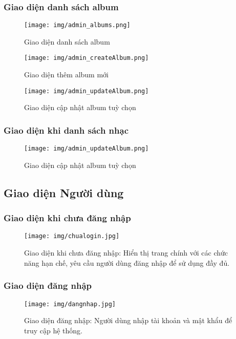 \documentclass[a4paper,12pt]{article}
\begin{document}
\subsubsection{Giao diện danh sách album}
\begin{figure}[H]
  \centering
  \texttt{[image: img/admin\_albums.png]}
  \caption{Giao diện danh sách album}
  \label{fig:admin-interface}
\end{figure}
\begin{figure}[H]
  \centering
  \texttt{[image: img/admin\_createAlbum.png]}
  \caption{Giao diện thêm album mới}
  \label{fig:admin-interface}
\end{figure}
\begin{figure}[H]
  \centering
  \texttt{[image: img/admin\_updateAlbum.png]}
  \caption{Giao diện cập nhật album tuỳ chọn}
  \label{fig:admin-interface}
\end{figure}
\subsubsection{Giao diện khi danh sách nhạc}
\begin{figure}[H]
  \centering
  \texttt{[image: img/admin\_updateAlbum.png]}
  \caption{Giao diện cập nhật album tuỳ chọn}
  \label{fig:admin-interface}
\end{figure}
\subsection{Giao diện Người dùng}
\newpage

\subsubsection{Giao diện khi chưa đăng nhập}
\begin{figure}[H]
  \centering
  \texttt{[image: img/chualogin.jpg]}
  \caption{Giao diện khi chưa đăng nhập: Hiển thị trang chính với các chức năng hạn chế, yêu cầu người dùng đăng nhập để sử dụng đầy đủ.}
  \label{fig:chualogin}
\end{figure}

\subsubsection{Giao diện đăng nhập}
\begin{figure}[H]
  \centering
  \texttt{[image: img/dangnhap.jpg]}
  \caption{Giao diện đăng nhập: Người dùng nhập tài khoản và mật khẩu để truy cập hệ thống.}
  \label{fig:dangnhap}
\end{figure}
\end{document}
